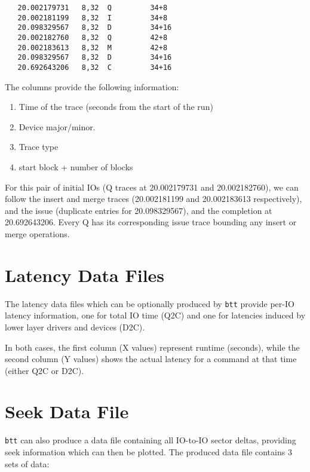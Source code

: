 \documentclass{article}
\begin{document}
\begin{verbatim}
   20.002179731   8,32  Q         34+8
   20.002181199   8,32  I         34+8
   20.098329567   8,32  D         34+16
   20.002182760   8,32  Q         42+8
   20.002183613   8,32  M         42+8
   20.098329567   8,32  D         34+16
   20.692643206   8,32  C         34+16
\end{verbatim}

  The columns provide the following information:

  \begin{enumerate}
    \item Time of the trace (seconds from the start of the run)

    \item Device major/minor.

    \item Trace type 

    \item start block + number of blocks
  \end{enumerate}
  
  For this pair of initial IOs (Q traces at 20.002179731 and
  20.002182760), we can follow the insert and merge traces (20.002181199
  and 20.002183613 respectively), and the issue (duplicate entries for
  20.098329567), and the completion at 20.692643206. Every Q has its
  corresponding issue trace bounding any insert or merge operations.

\newpage\section{\label{sec:lat}\label{sec:lat-q2c}\label{sec:lat-d2c}Latency Data Files}

  The latency data files which can be optionally produced by \texttt{btt}
  provide per-IO latency information, one for total IO time (Q2C) and
  one for latencies induced by lower layer drivers and devices (D2C).

  In both cases, the first column (X values) represent runtime (seconds),
  while the second column (Y values) shows the actual latency for a
  command at that time (either Q2C or D2C).

\newpage\section{\label{sec:seek}Seek Data File}

  \texttt{btt} can also produce a data file containing all IO-to-IO sector
  deltas, providing seek information which can then be plotted. The
  produced data file contains 3 sets of data:
\end{document}
